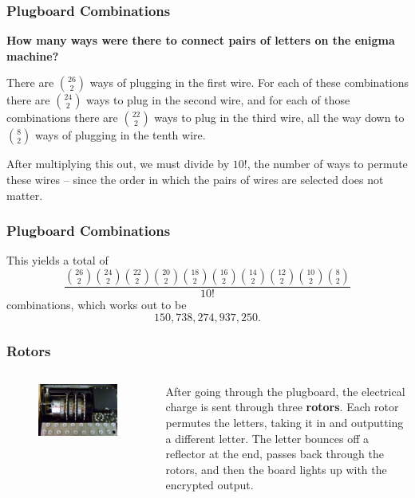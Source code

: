 \documentclass{beamer}
\newcommand{\<}{\langle}
\renewcommand{\>}{\rangle}
\begin{document}
\begin{frame}
\frametitle{Plugboard Combinations}

\textbf{How many ways were there to connect pairs of letters on the enigma machine?} \newline

There are $26 \choose 2$ ways of plugging in the first wire. For each of these combinations there are $24 \choose 2$ ways to plug in the second wire, and for each of those combinations there are $22 \choose 2$ ways to plug in the third wire, all the way down to $8\choose 2$ ways of plugging in the tenth wire. \newline

After multiplying this out, we must divide by $10!$, the number of ways to permute these wires -- since the order in which the pairs of wires are selected does not matter.
\end{frame}


\begin{frame}
\frametitle{Plugboard Combinations}

This yields a total of 
\[
\frac{{26 \choose 2 } {24 \choose 2 } {22 \choose 2 } {20 \choose 2 }{18 \choose 2 }{16 \choose 2 }{14 \choose 2 }{12 \choose 2 }{10 \choose 2 }{8 \choose 2 }}{10!}
\]
combinations, which works out to be 
\[
150,738,274,937,250.
\]
\end{frame}


\begin{frame}
\frametitle{Rotors}

\begin{columns}
\begin{column}{.6\textwidth}
\begin{figure}
\includegraphics[scale=.18]{IMG/rotors}

\end{figure}
\end{column}
\begin{column}{.4\textwidth}
After going through the plugboard, the electrical charge is sent through three \textbf{rotors}. Each rotor permutes the letters, taking it in and outputting a different letter. The letter bounces off a reflector at the end, passes back through the rotors, and then the board lights up with the encrypted output. 
\end{column}
\end{columns}
\end{frame}
\end{document}
